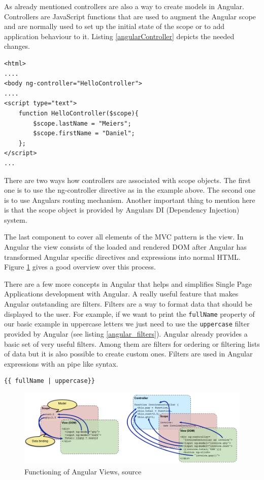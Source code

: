 As already mentioned controllers are also a way to create models in Angular.
Controllers are JavaScript functions that are used to augment the Angular scope and are normally used to set up the initial state of the scope or to add application behaviour to it.
Listing \ref{angularController} depicts the needed changes.

\begin{lstlisting}[label=angularController,caption=Angular Controller]
<html>
....
<body ng-controller="HelloController">
....
<script type="text">
	function HelloController($scope){
	    $scope.lastName = "Meiers";
	    $scope.firstName = "Daniel";
	};
</script>
...
\end{lstlisting}

There are two ways how controllers are associated with scope objects.
The first one is to use the ng-controller directive as in the example above.
The second one is to use Angulars routing mechanism.
Another important thing to mention here is that the scope object is provided by Angulars DI (Dependency Injection) system.
 
The last component to cover all elements of the MVC pattern is the view.
In Angular the view consists of the loaded and rendered DOM after Angular has transformed Angular specific directives and expressions into normal HTML.
Figure \ref{fig:angular_views} gives a good overview over this process.
 
There are a few more concepts in Angular that helps and simplifies Single Page Applications development with Angular.
A really useful feature that makes Angular outstanding are filters.
Filters are a way to format data that should be displayed to the user.
For example, if we want to print the \texttt{fullName} property of our basic example in uppercase letters we just need to use the \texttt{uppercase} filter provided by Angular (see listing \ref{angular_filters}).
Angular already provides a basic set of very useful filters. 
Among them are filters for ordering or filtering lists of data but it is also possible to create custom ones.
Filters are used in Angular expressions with an pipe like syntax.

\begin{lstlisting}[label=angular_filters,caption=Angular Filters]
 {{ fullName | uppercase}}
\end{lstlisting}

\begin{figure}
	\centering	
	\includegraphics[width=1.0\textwidth]{./img/tech-ana/angular_view.png}
	\caption{Functioning of Angular Views, source \autocite{tech-ana:ng-concepts}}
	\label{fig:angular_views}
\end{figure} 

